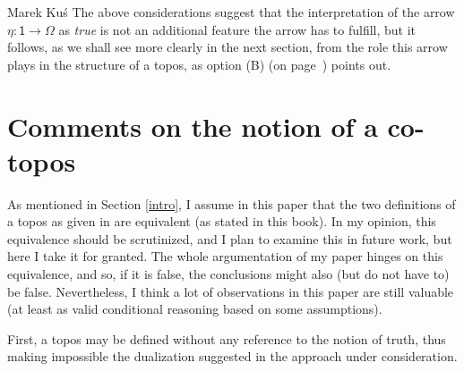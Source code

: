 \begin{artengenv}{Marek Ku\'s}
The above considerations suggest that the interpretation of the arrow $ \eta:\textsf{1}\to\Omega $ as \textit{true} is not an additional feature the arrow has to fulfill, but it follows, as we shall see more clearly in the next section, from the role this arrow plays in the structure of a topos, as option (B) (on page~\pageref{opcje}) points out.


\section{Comments on the notion of a co-topos}

As mentioned in Section \ref{intro}, I assume in this paper that the two definitions of a topos as given in \parencite[p.161f and 163]{maclane-moerdijk-1994} are equivalent (as stated in this book). In my opinion, this equivalence should be scrutinized, and I plan to examine this in future work, but here I take it for granted. The whole argumentation of my paper hinges on this equivalence, and so, if it is false, the conclusions might also (but do not have to) be false. Nevertheless, I think a lot of observations in this paper are still valuable (at least as valid conditional reasoning based on some assumptions).

First, a topos may be defined without any reference to the notion of truth, thus making impossible the dualization suggested in the approach under consideration.



\end{artengenv}
